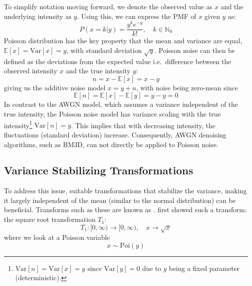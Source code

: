 To simplify notation moving forward, we denote the observed value as $x$ and the underlying intensity as $y$. Using this, we can express the \gls{PMF} of $x$ given $y$  as:
\begin{equation}\label{eq:poisson-pmf-1}
    P(x = k| y) = \frac{y^k e^{-y}}{k!} , \quad k \in \mathbb{N}_0
\end{equation}
Poisson distribution has the key property that the mean and variance are equal, $\mathbb{E}[x] = \text{Var}[x] = y$, with standard deviation $\sqrt{y}$. Poisson noise can then be defined as the deviations from the expected value i.e.\ difference between the observed intensity $x$ and the true intensity $y$:
\begin{equation}\label{eq:poisson-noise}
    n = x - \mathbb{E}[x] = x - y
\end{equation}
giving us the additive noise model $x = y + n$, with noise being zero-mean since
\begin{equation}\label{eq:zero-mean-noise}
    \mathbb{E}[n] = \mathbb{E}[x] - \mathbb{E}[y] = y - y = 0
\end{equation}
In contrast to the \gls{AWGN} model, which assumes a variance independent of the true intensity, the Poisson noise model has variance scaling with the true intensity\footnote{$\text{Var}[n] = \text{Var}[x] = y$ since $\text{Var}[y] = 0$ due to $y$ being a fixed parameter (deterministic).} $\text{Var}[n] = y$. This implies that with decreasing intensity, the fluctuations (standard deviation) increase. Consequently, \gls{AWGN} denoising algorithms, such as \gls{BM3D}, can not directly be applied to Poisson noise.

\subsection{Variance Stabilizing Transformations}\label{sec:variance-stabilizing-transformations}
To address this issue, suitable transformations that stabilize the variance, making it largely independent of the mean (similar to the normal distribution) can be beneficial. Transforms such as these are known as . \citeauthor{bartlettSquareRootTransformation1936} \cite{bartlettSquareRootTransformation1936} first showed such a transform: the square root transformation $T_1$:
\begin{equation}
    T_1: [0, \infty) \to [0, \infty), \quad x \to \sqrt{x}
\end{equation}
where we look at a Poisson variable
\begin{equation}\label{eq:poisson-pmf-2}
    x \sim \text{Poi}(y)
\end{equation}


